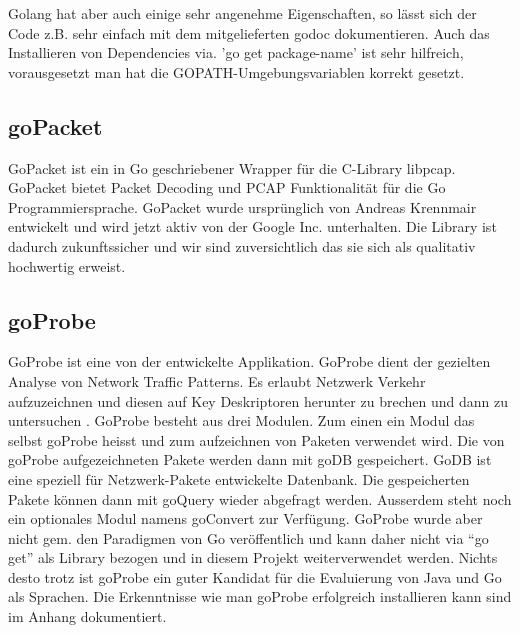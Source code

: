 Golang hat aber auch einige sehr angenehme Eigenschaften, so lässt sich der Code z.B. sehr einfach mit dem mitgelieferten godoc dokumentieren. Auch das Installieren von Dependencies via. 'go get package-name' ist sehr hilfreich, vorausgesetzt man hat die GOPATH-Umgebungsvariablen korrekt gesetzt.

\subsection{goPacket}
GoPacket ist ein in Go geschriebener Wrapper für die C-Library libpcap. GoPacket bietet Packet Decoding und \acs{PCAP} Funktionalität für die Go Programmiersprache\cite[:4]{goPacket}. GoPacket wurde ursprünglich von Andreas Krennmair entwickelt und wird jetzt aktiv von der Google Inc. unterhalten. Die Library ist dadurch zukunftssicher und wir sind zuversichtlich das sie sich als qualitativ hochwertig erweist.

\subsection{goProbe}
GoProbe ist eine von der \osag entwickelte Applikation. GoProbe dient der gezielten Analyse von Network Traffic Patterns. Es erlaubt Netzwerk Verkehr aufzuzeichnen und diesen auf Key Deskriptoren herunter zu brechen und dann zu untersuchen \cite[:2]{readme_goProbe}. 
GoProbe besteht aus drei Modulen. Zum einen ein Modul das selbst goProbe heisst und zum aufzeichnen von Paketen verwendet wird. Die von goProbe aufgezeichneten Pakete werden dann mit goDB gespeichert. GoDB ist eine speziell für Netzwerk-Pakete entwickelte Datenbank. Die gespeicherten Pakete können dann mit goQuery wieder abgefragt werden. Ausserdem steht noch ein optionales Modul namens goConvert zur Verfügung. GoProbe wurde aber nicht gem. den Paradigmen von Go veröffentlich und kann daher nicht via \enquote{go get} als Library bezogen und in diesem Projekt weiterverwendet werden. Nichts desto trotz ist goProbe ein guter Kandidat für die Evaluierung von Java und Go als Sprachen. Die Erkenntnisse wie man goProbe erfolgreich installieren kann sind im Anhang dokumentiert.